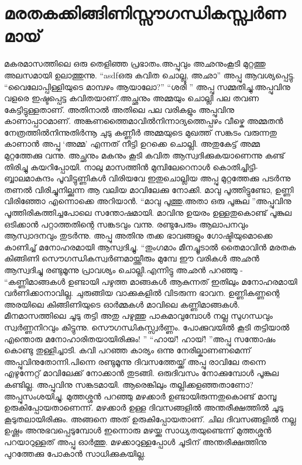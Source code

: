 \chapter{മരതകക്കിങ്ങിണിസ്സൗഗന്ധികസ്സ്വർണമായ്}
\obeylines
മകരമാസത്തിലെ ഒരു തെളിഞ്ഞ പ്രഭാതം.അപ്പുവും അഛനുംകൂടി മുറ്റത്തു അലസമായി ഉലാത്തുന്നു.
``asdfഒരു കവിത ചൊല്ലൂ, അഛാ'' അപ്പു ആവശ്യപ്പെട്ടു.
``വൈലോപ്പിള്ളിയുടെ മാമ്പഴം ആയാലോ?''
``ശരി '' അപ്പു സമ്മതിച്ചു.അപ്പുവിനു വളരെ ഇഷ്ടപ്പെട്ട കവിതയാണ്‌.അച്ഛനും അമ്മയും ചൊല്ലി പല തവണ കേട്ടിട്ടുള്ളതാണ്‌. അതിനാൽ അതിലെ പല വരികളും അപ്പുവിനു കാണാപ്പാഠമാണ്‌.
\hspace{2em}അങ്കണത്തൈമാവിൽനിന്നാദ്യത്തെപ്പഴം വീഴ്കെ  
\hspace{2em}അമ്മതൻ നേത്രത്തിൽനിന്നുതിർന്നൂ ചുടു കണ്ണീർ
അമ്മയുടെ മുഖത്ത് സങ്കടം വരുന്നതു കാണാൻ അപ്പു ‘അമ്മ’ എന്നത് നീട്ടി ഉറക്കെ ചൊല്ലി. അതുകേട്ട് അമ്മ മുറ്റത്തേക്കു വന്നു. അച്ഛനും മകനും കൂടി കവിത ആസ്വദിക്കുകയാണെന്നു കണ്ട് തിരിച്ചു കയറിപ്പോയി.
\hspace{2em}നാലു മാസത്തിൻ മുമ്പിലേറെനാൾ കൊതിച്ചിട്ടി-
\hspace{2em}ബ്ബാലമാകന്ദം പൂവിട്ടുണ്ണികൾ വിരിയവേ
ഇതുചൊല്ലിയ അപ്പു മുറ്റത്തേക്കു പടർന്നു തണൽ വിരിച്ചുനില്ക്കുന്ന ആ വലിയ മാവിലേക്കു നോക്കി. മാവു പൂത്തിട്ടുണ്ടോ, ഉണ്ണി വിരിഞ്ഞോ എന്നൊക്കെ അറിയാൻ.
``മാവു പൂത്തു.അതാ ഒരു പൂങ്കുല ''അപ്പുവിനു പൂത്തിരികത്തിച്ചപോലെ സന്തോഷമായി. മാവിനു ഉയരം ഉള്ളതുകൊണ്ട് പൂങ്കുല ഒടിക്കാൻ പറ്റാത്തതിന്റെ സങ്കടവും വന്നു. രണ്ടുപേരും ആലാപനവും ആസ്വാദനവും തുടർന്നു. അപ്പു അതിനു തക്ക ഭാവങ്ങളും ഗോഷ്ടിയുമൊക്കെ കാണിച്ച് മനോഹരമായി ആസ്വദിച്ചു.
\hspace{2em}``തുംഗമാം മീനച്ചൂടാൽ തൈമാവിൻ മരതക
\hspace{2em}കിങ്ങിണി സൌഗന്ധികസ്വർണമായ്ത്തീരും മുമ്പേ
ഈ വരികൾ അഛൻ ആസ്വദിച്ചു രണ്ടുമൂന്നു പ്രാവശ്യം ചൊല്ലി.എന്നിട്ടു അഛൻ പറഞ്ഞു - 
``കണ്ണിമാങ്ങകൾ ഉണ്ടായി പഴുത്ത മാങ്ങകൾ ആകുന്നത് ഇതിലും മനോഹരമായി വർണിക്കാനാവില്ല. ചുരുങ്ങിയ വാക്കുകളിൽ വിടരുന്ന ഭാവന. ഉണ്ണികണ്ണന്റെ അരയിലെ കിങ്ങിണിയുടെ ഓർമ്മകൾ മാവിലെ കണ്ണിമാങ്ങകൾ. മീനമാസത്തിലെ ചൂടു തട്ടി അതു പഴുത്തു പാകമാവുമ്പോൾ നല്ല സുഗന്ധവും സ്വർണ്ണനിറവും കിട്ടുന്നു. സൌഗന്ധികസ്സ്വർണ്ണം. പോക്കുവയിൽ കൂടി തട്ടിയാൽ എന്തൊരു മനോഹാരിതയായിരിക്കും! ''
``ഹായ്! ഹായ്! ''അപ്പു സന്തോഷം കൊണ്ടു തുള്ളിച്ചാടി.
  കവി പറഞ്ഞ കാര്യം ഒന്നു നേരില്കാണണമെന്ന് അപ്പുവിനുതോന്നി.പിന്നെ രണ്ടുമൂന്നു ദിവസത്തേയ്ക്ക് അപ്പു രാവിലേ തന്നെ എഴുന്നേറ്റ് മാവിലേക്ക് നോക്കാൻ തുടങ്ങി. ഒരുദിവസം നോക്കുമ്പോൾ പൂങ്കുല കണ്ടില്ല. അപ്പുവിനു സങ്കടമായി. ആരെങ്കിലും തല്ലിക്കളഞ്ഞതാണോ? അപ്പുസംശയിച്ചു. മുത്തശ്ശൻ പറഞ്ഞു മഴക്കാർ ഉണ്ടായിരുന്നതുകൊണ്ട് മാമ്പൂ ഉരുകിപ്പോയതാണെന്ന്. മഴക്കാർ ഉള്ള ദിവസങ്ങളിൽ അന്തരീക്ഷത്തിൽ ചൂടു കൂടുതലായിരിക്കും. അങ്ങനെ അത് ഉരുകിപ്പോയതാണ്‌. ചില ദിവസങ്ങളിൽ നല്ല ഉഷ്ണം അനുഭവപ്പെടുമ്പോൾ ഇന്നൊരു മഴയ്ക്കു സാധ്യതയുണ്ടെന്ന് മുത്തശ്ശൻ പറയാറുള്ളത് അപ്പു ഓർത്തു. മഴക്കാറുള്ളപ്പോൾ ചൂടിന്‌ അന്തരീക്ഷത്തിനു പുറത്തേക്കു പോകാൻ സാധിക്കുകയില്ല.
